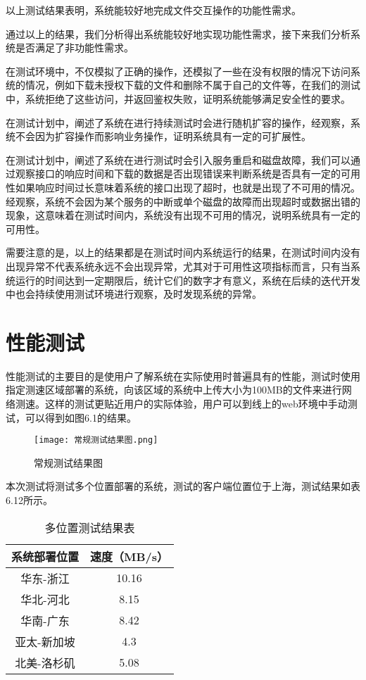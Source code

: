 以上测试结果表明，系统能较好地完成文件交互操作的功能性需求。

通过以上的结果，我们分析得出系统能较好地实现功能性需求，接下来我们分析系统是否满足了非功能性需求。

在测试环境中，不仅模拟了正确的操作，还模拟了一些在没有权限的情况下访问系统的情况，例如下载未授权下载的文件和删除不属于自己的文件等，在我们的测试中，系统拒绝了这些访问，并返回鉴权失败，证明系统能够满足安全性的要求。

在测试计划中，阐述了系统在进行持续测试时会进行随机扩容的操作，经观察，系统不会因为扩容操作而影响业务操作，证明系统具有一定的可扩展性。

在测试计划中，阐述了系统在进行测试时会引入服务重启和磁盘故障，我们可以通过观察接口的响应时间和下载的数据是否出现错误来判断系统是否具有一定的可用性如果响应时间过长意味着系统的接口出现了超时，也就是出现了不可用的情况。经观察，系统不会因为某个服务的中断或单个磁盘的故障而出现超时或数据出错的现象，这意味着在测试时间内，系统没有出现不可用的情况，说明系统具有一定的可用性。

需要注意的是，以上的结果都是在测试时间内系统运行的结果，在测试时间内没有出现异常不代表系统永远不会出现异常，尤其对于可用性这项指标而言，只有当系统运行的时间达到一定期限后，统计它们的数字才有意义，系统在后续的迭代开发中也会持续使用测试环境进行观察，及时发现系统的异常。

\section{性能测试}%
性能测试的主要目的是使用户了解系统在实际使用时普遍具有的性能，测试时使用指定测速区域部署的系统，向该区域的系统中上传大小为100MB的文件来进行网络测速。这样的测试更贴近用户的实际体验，用户可以到线上的web环境中手动测试，可以得到如图6.1的结果。

\begin{figure}
    \centering
    \texttt{[image: 常规测试结果图.png]}
    \caption{常规测试结果图}
\end{figure}

本次测试将测试多个位置部署的系统，测试的客户端位置位于上海，测试结果如表6.12所示。

\begin{table}[h]
    \centering
    \caption{多位置测试结果表}
    \begin{tabular}{cc}
      \toprule
      系统部署位置   & 速度（MB/s）   \\
      \midrule
      华东-浙江     & 10.16  \\
      华北-河北     & 8.15   \\
      华南-广东     & 8.42  \\
      亚太-新加坡   & 4.3   \\
      北美-洛杉矶   & 5.08  \\
      \bottomrule
    \end{tabular}
\end{table}

